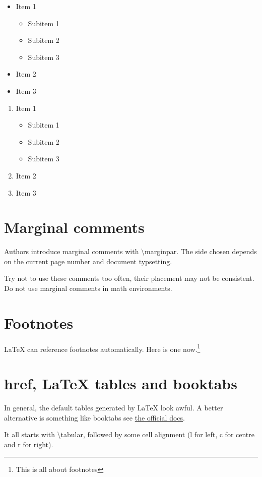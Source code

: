 \documentclass{sample}
\begin{document}
\begin{itemize}
\item Item 1
	\begin{itemize}
	\item Subitem 1
	\item Subitem 2
	\item Subitem 3
	\end{itemize}
\item Item 2
\item Item 3
\end{itemize}

\begin{enumerate}
\item Item 1
	\begin{itemize}
	\item Subitem 1
	\item Subitem 2
	\item Subitem 3
	\end{itemize}
\item Item 2
\item Item 3
\end{enumerate}

\section{Marginal comments}
Authors introduce marginal comments with \textbackslash marginpar. The side chosen depends on the current page number and document typsetting.


Try not to use these comments too often, their placement may not be consistent. Do not use marginal comments in math environments.

\section{Footnotes}
LaTeX can reference footnotes automatically. Here is one now.\footnote{This is all about footnotes}

\newpage
\section{href, LaTeX tables and booktabs}
In general, the default tables generated by LaTeX look awful. A better alternative is something like booktabs see \href{https://ctan.org/pkg/booktabs}{the official docs}.

It all starts with \textbackslash tabular, followed by some cell alignment (l for left, c for centre and r for right). 
\end{document}
